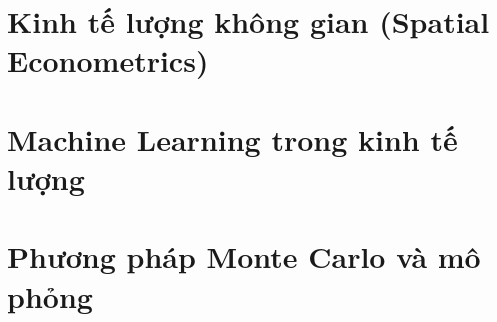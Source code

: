 \documentclass[openany]{book}
\begin{document}
\part{Kinh tế lượng không gian (Spatial Econometrics)}




\part{Machine Learning trong kinh tế lượng}




\part{Phương pháp Monte Carlo và mô phỏng}





\appendix




\end{document}
